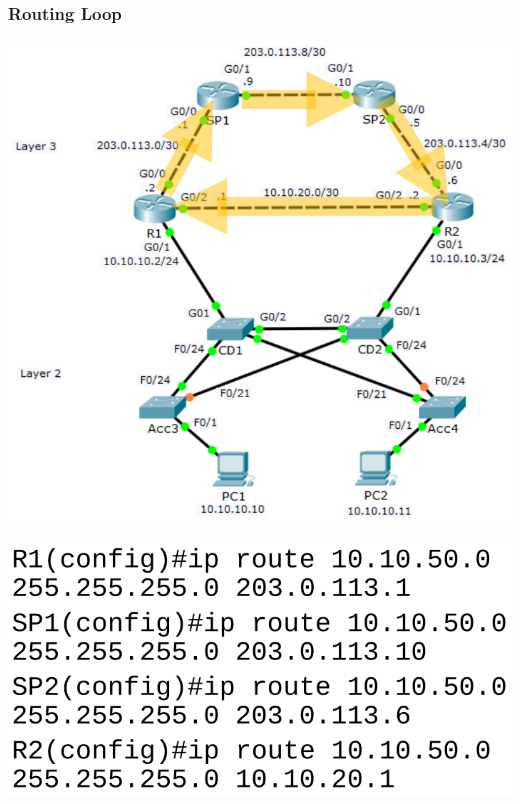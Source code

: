 \documentclass[pdflatex,compress,mathserif]{beamer}
\begin{document}
\begin{frame}
	\frametitle{Routing Loop}
	\begin{multicols}{2}
		\begin{center}
			\includegraphics[width=\linewidth]{img/img14}
		\end{center}
		\columnbreak
		\begin{center}
			\includegraphics[width=\linewidth]{img/img15}
		\end{center}
	\end{multicols}
\end{frame}
\end{document}
